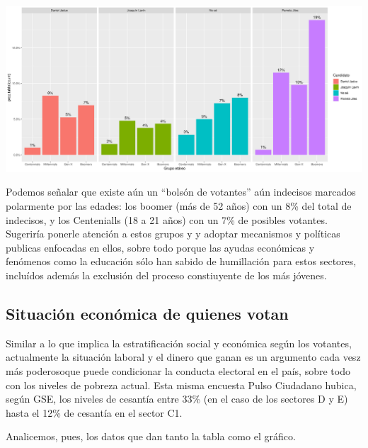 \documentclass[
]{article}
\begin{document}
\includegraphics{EdadPlot.png} \newline

Podemos señalar que existe aún un ``bolsón de votantes'' aún indecisos
marcados polarmente por las edades: los boomer (más de 52 años) con un
8\% del total de indecisos, y los Centenialls (18 a 21 años) con un 7\%
de posibles votantes. Sugeriría ponerle atención a estos grupos y y
adoptar mecanismos y políticas publicas enfocadas en ellos, sobre todo
porque las ayudas económicas y fenómenos como la educación sólo han
sabido de humillación para estos sectores, incluídos además la exclusión
del proceso constiuyente de los más jóvenes.

\newline

\hypertarget{situaciuxf3n-econuxf3mica-de-quienes-votan}{%
\subsection{\texorpdfstring{\textbf{Situación económica de quienes
votan}}{Situación económica de quienes votan}}\label{situaciuxf3n-econuxf3mica-de-quienes-votan}}

Similar a lo que implica la estratificación social y económica según los
votantes, actualmente la situación laboral y el dinero que ganan es un
argumento cada vesz más poderosoque puede condicionar la conducta
electoral en el país, sobre todo con los niveles de pobreza actual. Esta
misma encuesta Pulso Ciudadano hubica, según GSE, los niveles de
cesantía entre 33\% (en el caso de los sectores D y E) hasta el 12\% de
cesantía en el sector C1.

Analicemos, pues, los datos que dan tanto la tabla como el gráfico.
\end{document}
